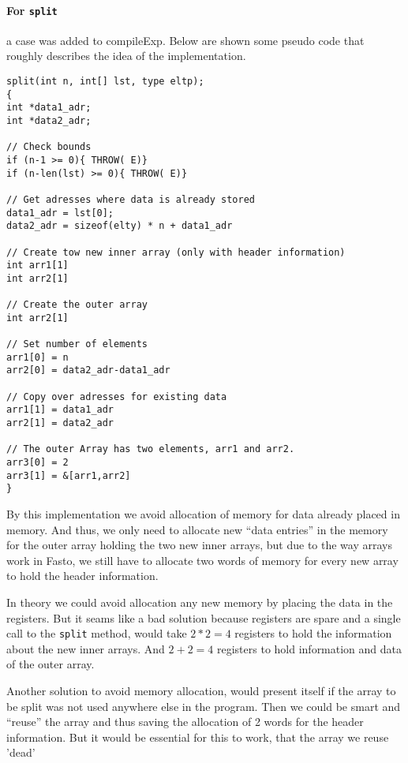 \documentclass[11pt,a4paper]{article}
\begin{document}
\paragraph{For \texttt{split}} a case was added to compileExp.
Below are shown some pseudo code that roughly describes the idea of the implementation.
\begin{lstlisting}
split(int n, int[] lst, type eltp);
{
int *data1_adr;
int *data2_adr;

// Check bounds
if (n-1 >= 0){ THROW( E)} 
if (n-len(lst) >= 0){ THROW( E)} 

// Get adresses where data is already stored
data1_adr = lst[0];
data2_adr = sizeof(elty) * n + data1_adr 

// Create tow new inner array (only with header information)
int arr1[1]
int arr2[1]

// Create the outer array
int arr2[1]

// Set number of elements
arr1[0] = n
arr2[0] = data2_adr-data1_adr

// Copy over adresses for existing data
arr1[1] = data1_adr
arr2[1] = data2_adr

// The outer Array has two elements, arr1 and arr2.
arr3[0] = 2
arr3[1] = &[arr1,arr2] 
}
\end{lstlisting}
By this implementation we avoid allocation of memory for data already placed
in memory.
And thus, we only need to allocate new ``data entries'' in the memory for the
outer array holding the two new inner arrays, but due to the way arrays work
in Fasto, we still have to allocate two words of memory for every new array to
hold the header information.

In theory we could avoid allocation any new memory by placing the data in the
registers. But it seams like a bad solution because registers are spare and
a single call to the \texttt{split} method, would take $2*2 = 4$ registers to
hold the information about the new inner arrays. And $2+2 = 4$ registers to
hold information and data
of the outer array. 

Another solution to avoid memory allocation, would present itself if the array
to be split was not used anywhere else in the program. Then we could be smart
and ``reuse'' the array and thus saving the allocation of 2 words for the
header information. But it would be essential for this to work, that the array
we reuse 'dead'
\end{document}
